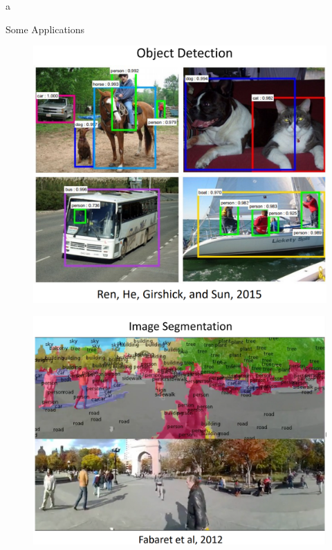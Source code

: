 a\documentclass[10pt]{beamer}
\theoremstyle{remark}
\theoremstyle{definition}
\begin{document}
\begin{frame}[allowframebreaks]{Some Applications}
\framebreak

\begin{figure}
\centering
\includegraphics[width=1.0\textwidth,height=0.9\textheight,keepaspectratio]{./images/cv_4.png}
\end{figure}

\framebreak

\begin{figure}
\centering
\includegraphics[width=1.0\textwidth,height=0.9\textheight,keepaspectratio]{./images/cv_5.png}
\end{figure}


\end{frame}
\end{document}

